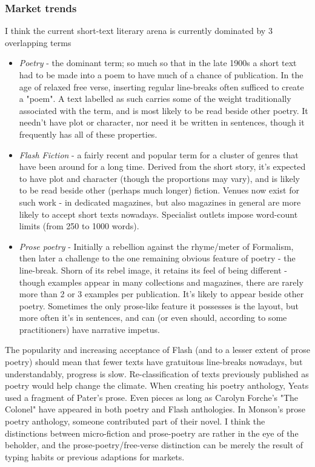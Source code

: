 \documentclass[11pt]{article}
\begin{document}
\subsubsection*{Market trends}
I think the current short-text literary arena is currently dominated by 3 overlapping terms
\begin{itemize}
\item \textit{Poetry} - the dominant term; so much so that in the late 1900s a short text had to be made into a poem to have much of a chance of publication. In the age of relaxed free verse, inserting regular line-breaks often sufficed to create a "poem". A text labelled as such carries some of the weight traditionally associated with the term, and is most likely to be read beside other poetry. It needn't have plot or character, nor need it be written in sentences, though it frequently has all of these properties.
\item \textit{Flash Fiction} - a fairly recent and popular term for a cluster of genres that have been around for a long time. Derived from the short story, it's expected to have plot and character (though the proportions may vary), and is likely to be read beside other (perhaps much longer) fiction. Venues now exist for such work - in dedicated magazines, but also magazines in general are more likely to accept short texts nowadays. Specialist outlets impose word-count limits (from 250 to 1000 words).
\item \textit{Prose poetry} - Initially a rebellion against the rhyme/meter of Formalism, then later a challenge to the one remaining obvious feature of poetry - the line-break. Shorn of its rebel image, it retains its feel of being different - though examples appear in many collections and magazines, there are rarely more than 2 or 3 examples per publication. It's likely to appear beside other poetry.  Sometimes the only prose-like feature it possesses is the layout, but more often it's in sentences, and can (or even should, according to some practitioners) have narrative impetus.
\end{itemize}
The popularity and increasing acceptance of Flash (and to a lesser extent of prose poetry) should mean that fewer texts have gratuitous line-breaks nowadays, but understandably, progress is slow. Re-classification of texts previously published as poetry would help change the climate. When creating his poetry anthology, Yeats used a fragment of Pater's prose. Even pieces as long as Carolyn Forche's "The Colonel" have appeared in both poetry and Flash anthologies. In Monson's prose poetry anthology, someone contributed part of their novel. I think the distinctions between micro-fiction and prose-poetry are rather in the eye of the beholder, and the prose-poetry/free-verse distinction can be merely the result of typing habits or previous adaptions for markets.
\end{document}
